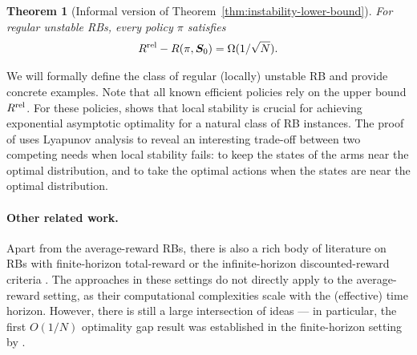 \documentclass[11pt,letterpaper]{article}
\theoremstyle{plain}
\newtheorem*{theorem*}{Theorem}
\theoremstyle{definition}
\theoremstyle{remark}
\newcommand{\ve}[1]{\bm{#1}}
\newcommand{\veS}{\ve{S}}
\newcommand{\rel}{\textup{rel}} %
\newcommand{\ravg}{R}
\newcommand{\rsysn}{\ravg(\pi, \veS_0)}
\newcommand{\rrel}{\ravg^\rel}
\begin{document}
\begin{theorem*}[Informal version of Theorem~\ref{thm:instability-lower-bound}]
    For regular unstable RBs, every policy $\pi$ satisfies
    \begin{align}
        \rrel - \rsysn = \Omega(1/\sqrt{N}).
    \end{align}
\end{theorem*}
We will formally define the class of regular (locally) unstable RB and provide concrete examples. Note that all known efficient policies rely on the upper bound $\rrel$.
For these policies,  shows that local stability is crucial for achieving exponential asymptotic optimality for a natural class of RB instances. 
The proof of  uses Lyapunov analysis to reveal an interesting trade-off between two competing needs when local stability fails: to keep the states of the arms near the optimal distribution, and to take the optimal actions when the states are near the optimal distribution. 


\paragraph{Other related work.} Apart from the average-reward RBs, there is also a rich body of literature on RBs with finite-horizon total-reward \citep{HuFra_17_rb_asymptotic,ZayJasWan_19_rb,BroSmi_19_rb,ZhaFra_21,BroZha_22,DaeGhoGri_23,GhoNagJaiTam_23_finite_discount,BroZha_23_ftva_and_reopt,GasGauYan_23_exponential,GasGauYan_24_reopt} or the infinite-horizon discounted-reward criteria \citep{BroSmi_19_rb,ZhaFra_22_discounted_rb,GhoNagJaiTam_23_finite_discount,BroZha_23_ftva_and_reopt}. 
The approaches in these settings do not directly apply to the average-reward setting, as their computational complexities scale with the (effective) time horizon. 
However, there is still a large intersection of ideas --- in particular, the first $O(1/N)$ optimality gap result was established in the finite-horizon setting by \cite{ZhaFra_21}.  
\end{document}
